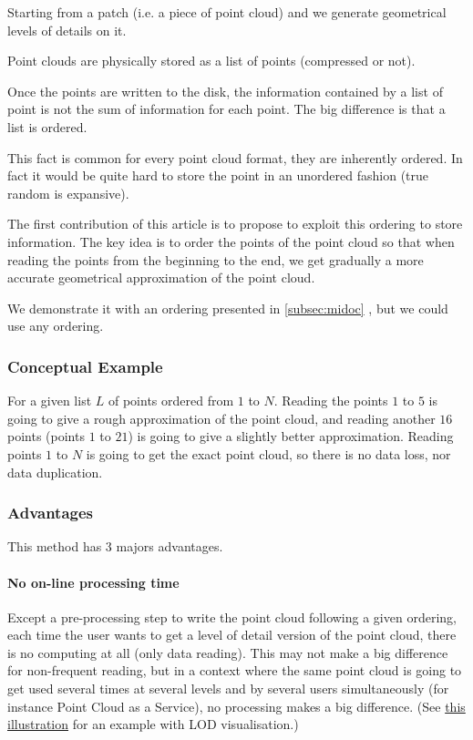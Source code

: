 			
			Starting from a patch (i.e. a piece of point cloud) and we generate geometrical levels of details on it.
			
			Point clouds are physically stored as a list of points (compressed or not). 
			
			Once the points are written to the disk, the information contained by a list of point is not the sum of information for each point. The big difference is that a list is ordered.
			
			This fact is common for every point cloud format, they are inherently ordered. In fact it would be quite hard to store the point in an unordered fashion (true random is expansive).
			
			The first contribution of this article is to propose to exploit this ordering to store information.
			The key idea is to order the points of the point cloud so that when reading the points from the beginning to the end, we get gradually a more accurate geometrical approximation of the point cloud. 
			
			We demonstrate it with an ordering presented in  \ref{subsec:midoc} , but we could use any ordering.
			
		\subsubsection{Conceptual Example}
			For a given list $L$ of points ordered from $1$ to $N$.
			Reading the points $1$ to $5$ is going to give a rough approximation of the point cloud, and reading another $16$ points (points $1$ to $21$) is going to give a slightly better approximation. Reading points $1$ to $N$ is going to get the exact point cloud, so there is no data loss, nor data duplication.
		
		\subsubsection{Advantages}
			This method has 3 majors advantages.
			\paragraph{No on-line processing time}
				Except a pre-processing step to write the point cloud following a given ordering, each time the user wants to get a level of detail version of the point cloud, there is no computing at all (only data reading).
				This may not make a big difference for non-frequent reading, but in a context where the same point cloud is going to get used several times at several levels and by several users simultaneously (for instance Point Cloud as a Service), no processing makes a big difference.
				(See \href{fig:all_lod_illustration}{this illustration} for an example with LOD visualisation.) 		
